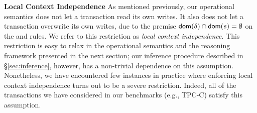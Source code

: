 \textbf{Local Context Independence} As mentioned previously, our
operational semantics does not let a transaction read its own writes.
It also does not let a transaction overwrite its own writes, due to
the premise $\textsf{dom}(\delta)\cap\textsf{dom}(s) = \emptyset$ on the
 and  rules. We refer to this
restriction as \emph{local context independence}.  This restriction is
easy to relax in the operational semantics and the reasoning framework
presented in the next section; our inference procedure described in
\S\ref{sec:inference}, however, has a non-trivial dependence on this
assumption.  Nonetheless, we have encountered few instances in
practice where enforcing local context independence turns out to be a
severe restriction. Indeed, all of the transactions we have considered
in our benchmarks (e.g., TPC-C) satisfy this assumption.



